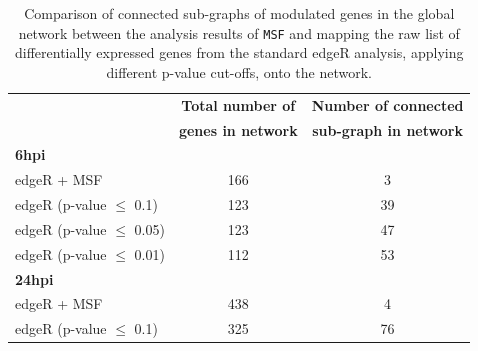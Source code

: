 \documentclass[10pt,a4paper,twocolumn]{article}
\begin{document}
\begin{table}[]
	\centering
	\caption{Comparison of connected sub-graphs of modulated genes
          in the global network between the analysis results of
          \texttt{MSF} and mapping the raw list of differentially
          expressed genes from the standard edgeR analysis, applying
          different p-value cut-offs, onto the network. }
	\label{tab:rawVsHartung}
	\begin{tabular}{lll}
		\hline
		\multicolumn{1}{|l|}{}                            & \multicolumn{1}{c|}{\textbf{Total number of}}       & \multicolumn{1}{c|}{\textbf{Number of connected}}      \\ 
                \multicolumn{1}{|l|}{}                            & \multicolumn{1}{c|}{\textbf{genes in network}}      & \multicolumn{1}{c|}{\textbf{sub-graph in network}}     \\ \hline
		\multicolumn{1}{|l|}{\textbf{6hpi}}               & \multicolumn{1}{l|}{}                                                & \multicolumn{1}{c|}{}                 \\ \hline
		\multicolumn{1}{|l|}{edgeR + MSF}                 & \multicolumn{1}{c|}{166}                                             & \multicolumn{1}{c|}{3}                \\ \hline
		\multicolumn{1}{|l|}{edgeR (p-value $\leq$ 0.1)}  & \multicolumn{1}{c|}{123}                                             & \multicolumn{1}{c|}{39}               \\ \hline
		\multicolumn{1}{|l|}{edgeR (p-value $\leq$ 0.05)} & \multicolumn{1}{c|}{123}                                             & \multicolumn{1}{c|}{47}               \\ \hline
		\multicolumn{1}{|l|}{edgeR (p-value $\leq$ 0.01)} & \multicolumn{1}{c|}{112}                                             & \multicolumn{1}{c|}{53}               \\ \hline
		\multicolumn{1}{|l|}{\textbf{24hpi}}              & \multicolumn{1}{c|}{}                                                & \multicolumn{1}{c|}{}                 \\ \hline
		\multicolumn{1}{|l|}{edgeR + MSF}                 & \multicolumn{1}{c|}{438}                                             & \multicolumn{1}{c|}{4}                \\ \hline
		\multicolumn{1}{|l|}{edgeR (p-value $\leq$ 0.1)}  & \multicolumn{1}{c|}{325}                                             & \multicolumn{1}{c|}{76}               \\ \hline

\end{tabular}
\end{table}
\end{document}
